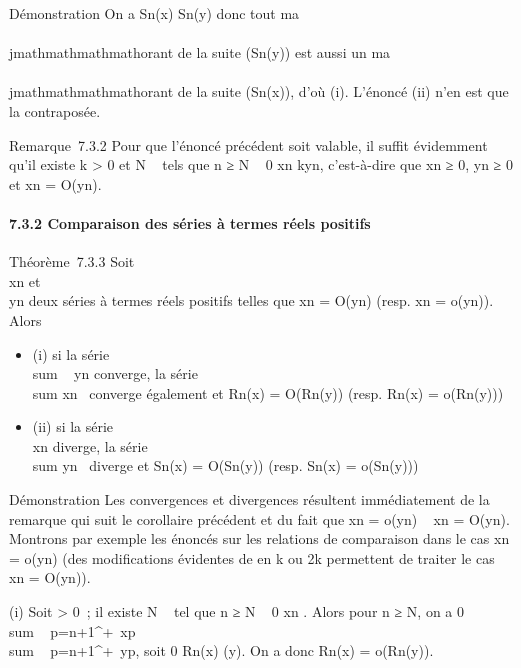 Démonstration On a Sn(x) \leq Sn(y) donc tout ma\\\\jmathmathmathmathorant
de la suite (Sn(y)) est aussi un ma\\\\jmathmathmathmathorant de la suite
(Sn(x)), d'où (i). L'énoncé (ii) n'en est que la contraposée.

Remarque~7.3.2 Pour que l'énoncé précédent soit valable, il suffit
évidemment qu'il existe k \textgreater{} 0 et N \in {}~ tels que n ≥ N \rigtharrow~ 0 \leq
xn \leq kyn, c'est-à-dire que xn ≥ 0,
yn ≥ 0 et xn = O(yn).

\paragraph{7.3.2 Comparaison des séries à termes réels positifs}

Théorème~7.3.3 Soit \\\sum
 xn et \\\sum
 yn deux séries à termes réels positifs telles que
xn = O(yn) (resp. xn = o(yn)).
Alors

\begin{itemize}
\itemsep1pt\parskip0pt
\item
  (i) si la série \\sum ~
  yn converge, la série
  \\sum  xn~
  converge également et Rn(x) = O(Rn(y)) (resp.
  Rn(x) = o(Rn(y)))
\item
  (ii) si la série \\\sum
   xn diverge, la série
  \\sum  yn~
  diverge et Sn(x) = O(Sn(y)) (resp. Sn(x)
  = o(Sn(y)))
\end{itemize}

Démonstration Les convergences et divergences résultent immédiatement de
la remarque qui suit le corollaire précédent et du fait que xn
= o(yn) \rigtharrow~ xn = O(yn). Montrons par exemple
les énoncés sur les relations de comparaison dans le cas xn =
o(yn) (des modifications évidentes de \epsilon en k ou 2k permettent
de traiter le cas xn = O(yn)).

(i) Soit \epsilon \textgreater{} 0~; il existe N \in {}~ tel que n ≥ N \rigtharrow~ 0 \leq
xn \leq \epsilonyn. Alors pour n ≥ N, on a 0
\leq\\sum ~
p=n+1^+\infty~xp \leq
\epsilon\\sum ~
p=n+1^+\infty~yp, soit 0 \leq Rn(x) \leq
\epsilonRn(y). On a donc Rn(x) = o(Rn(y)).


